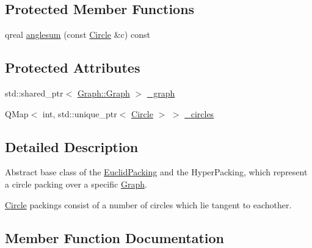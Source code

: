 \subsection*{Protected Member Functions}
\begin{DoxyCompactItemize}
\item 
qreal \hyperlink{class_circles_1_1_packing_1_1_packing_ae517dffd81c8526daf4d68dc556edb7a}{anglesum} (const \hyperlink{class_circles_1_1_packing_1_1_circle}{Circle} \&c) const 
\end{DoxyCompactItemize}
\subsection*{Protected Attributes}
\begin{DoxyCompactItemize}
\item 
std\+::shared\+\_\+ptr$<$ \hyperlink{class_circles_1_1_graph_1_1_graph}{Graph\+::\+Graph} $>$ \hyperlink{class_circles_1_1_packing_1_1_packing_aafdbbfa163315d47de5805b7eb55c549}{\+\_\+graph}
\item 
Q\+Map$<$ int, std\+::unique\+\_\+ptr$<$ \hyperlink{class_circles_1_1_packing_1_1_circle}{Circle} $>$ $>$ \hyperlink{class_circles_1_1_packing_1_1_packing_a34a1ece667f3111c1eb434ee7660b31a}{\+\_\+circles}
\end{DoxyCompactItemize}


\subsection{Detailed Description}
Abstract base class of the \hyperlink{class_circles_1_1_packing_1_1_euclid_packing}{Euclid\+Packing} and the Hyper\+Packing, which represent a circle packing over a specific \hyperlink{namespace_circles_1_1_graph}{Graph}.

\hyperlink{class_circles_1_1_packing_1_1_circle}{Circle} packings consist of a number of circles which lie tangent to eachother. 

\subsection{Member Function Documentation}
\hypertarget{class_circles_1_1_packing_1_1_packing_a41991c2ef4010416fb382ae4e180e7ee}{}
